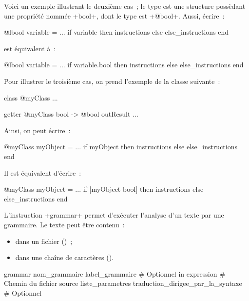 Voici un exemple illustrant le deuxième cas~; le type  est une structure possèdant une propriété nommée \ggs+bool+, dont le type est \ggs+@bool+. Aussi, écrire~:

\begin{galgas}
@lbool variable = ...
if variable then
  instructions
else
  else_instructions
end
\end{galgas}


est équivalent à~:
\begin{galgas}
@lbool variable = ...
if variable.bool then
  instructions
else
  else_instructions
end
\end{galgas}


Pour illustrer le troisième cas, on prend l'exemple de la classe suivante~:
\begin{galgas}
class @myClass { ... }

getter @myClass bool -> @bool outResult { ... }
\end{galgas}

Ainsi, on peut écrire~:
\begin{galgas}
@myClass myObject = ...
if myObject then
  instructions
else
  else_instructions
end
\end{galgas}


Il est équivalent d'écrire~:
\begin{galgas}
@myClass myObject = ...
if [myObject bool] then
  instructions
else
  else_instructions
end
\end{galgas}






L'instruction \ggs+grammar+ permet d'exécuter l'analyse d'un texte par une grammaire. Le texte peut être contenu~:
\begin{itemize}
  \item dans un fichier ()~;
  \item dans une chaîne de caractères ().
\end{itemize}







\begin{galgasbox}
grammar
  nom_grammaire
  label_grammaire # Optionnel
  in expression # Chemin du fichier source
  liste_parametres
  traduction_dirigee_par_la_syntaxe # Optionnel
\end{galgasbox}

